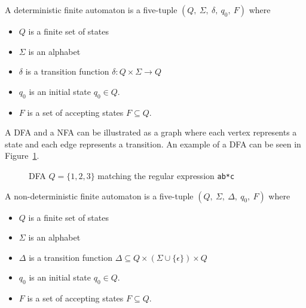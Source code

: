 \documentclass[12pt]{article}
\theoremstyle{definition}
\begin{document}
\begin{definition} A deterministic finite automaton is a five-tuple $(Q,\ \Sigma,\ \delta,\ q_0,\ F)$ where
\label{dfa definition}

\begin{itemize}
	\item $Q$ is a finite set of states
	\item $\Sigma$ is an alphabet
	\item $\delta$ is a transition function $\delta: Q \times \Sigma \rightarrow Q$
	\item $q_0$ is an initial state $q_0 \in Q$.
	\item $F$ is a set of accepting states $F \subseteq Q$.
\end{itemize}
\end{definition}
 
A DFA and a NFA can be illustrated as a graph where each vertex represents a state and each edge represents a transition. An example of a DFA can be seen in Figure~\ref{dfa_simple}. \\

\begin{figure}[H]
  \begin{center}

	
	\caption{DFA $Q = \{1, 2, 3\}$ matching the regular expression \texttt{ab*c}}
	\label{dfa_simple}
  \end{center}
\end{figure}


\begin{definition} A non-deterministic finite automaton is a five-tuple $(Q,\ \Sigma,\ \Delta,\ q_0,\ F)$ where

\begin{itemize}
	\item $Q$ is a finite set of states
	\item $\Sigma$ is an alphabet
	\item $\Delta$ is a transition function $\Delta \subseteq Q \times (\Sigma \cup \{\epsilon\}) \times Q$
	\item $q_0$ is an initial state $q_0 \in Q$.
	\item $F$ is a set of accepting states $F \subseteq Q$.
\end{itemize}

\label{nfa definition}
\end{definition}
\end{document}
